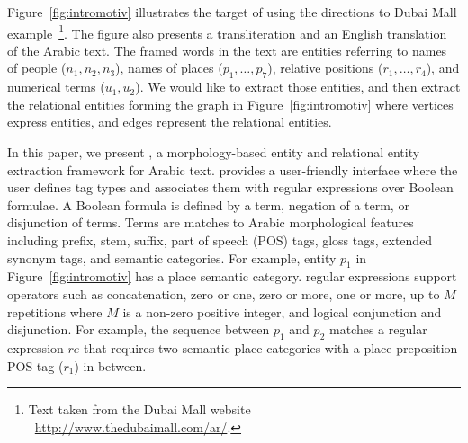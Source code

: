 

Figure~\ref{fig:intromotiv} illustrates the target of \framework using 
the directions to Dubai Mall example~\footnote{Text taken from the Dubai 
Mall website ~\url{http://www.thedubaimall.com/ar/}.}.
The figure also presents a transliteration and an English translation of 
the Arabic text.
The framed words in the text are entities referring to names of people 
($n_1,n_2,n_3$), 
names of places ($p_1,\dots,p_7$), 
relative positions ($r_1,\dots,r_4$), 
and numerical terms ($u_1,u_2$). 
We would like to extract those entities, and then extract
the relational entities forming the graph in Figure~\ref{fig:intromotiv} 
where vertices express entities, 
and edges represent the relational entities.



In this paper, 
we present \framework, a morphology-based entity and relational entity
extraction framework for Arabic text.
\framework provides a user-friendly interface where the user defines tag types 
and associates them with
regular expressions over 
Boolean formulae.
%
A Boolean formula is defined by a term, negation of a term, or disjunction of terms.
Terms are matches to Arabic morphological features including 
prefix, stem, suffix, part of speech (POS) tags, gloss tags, extended synonym 
tags, and semantic categories.
For example, entity $p_1$ in Figure~\ref{fig:intromotiv} has a place semantic 
category.
\framework regular expressions support operators such as concatenation, 
zero or one, zero or more, one or more, up to $M$ repetitions where $M$ is 
a non-zero positive integer, and logical conjunction and disjunction.
For example, the sequence between $p_1$ and $p_2$ matches a regular expression $re$ 
that requires two semantic place categories with a place-preposition POS 
tag ($r_1$) in between.

